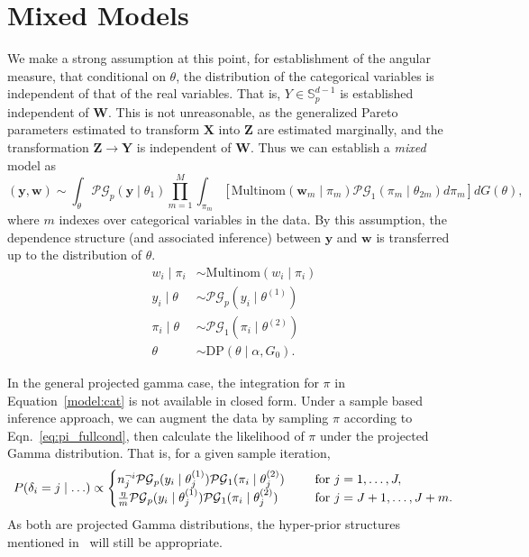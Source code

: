 \section{Mixed Models}
We make a strong assumption at this point, for establishment of the angular 
  measure, that conditional on $\theta$, the distribution of the categorical 
  variables is independent of that of the real variables.  That is, 
  $Y \in {\mathbb S}_{p}^{d-1}$ is established independent of $\bm{W}$.  This is 
  not unreasonable, as the generalized Pareto parameters estimated to transform 
  $\bm{X}$ into $\bm{Z}$ are estimated marginally, and the transformation 
  $\bm{Z}\to\bm{Y}$ is independent of $\bm{W}$.  Thus we can establish a 
  \emph{mixed} model as
  \begin{equation}
    \label{model:mixed}
    (\bm{y},\bm{w})\sim \int_{\theta}\mathcal{PG}_{p}(\bm{y}\mid\theta_1)
      \prod_{m = 1}^M\int_{\pi_m}
      \left[\text{Multinom}(\bm{w}_m\mid\pi_m)
                \mathcal{PG}_1(\pi_m\mid\theta_{2m})d\pi_{m}\right]dG(\theta),
  \end{equation}
  where $m$ indexes over categorical variables in the data. By this assumption, 
  the dependence structure (and associated inference) between $\bm{y}$ and 
  $\bm{w}$ is transferred up to the distribution of $\theta$.
  \begin{equation*}
    \label{model:mixeddp}
    \begin{aligned}
    w_i\mid \pi_i &\sim \text{Multinom}(w_i\mid \pi_i)\\
    y_i\mid\theta &\sim\mathcal{PG}_p(y_i\mid\theta^{(1)})\\
    \pi_i\mid\theta &\sim \mathcal{PG}_1(\pi_i\mid\theta^{(2)})\\
    \theta &\sim \text{DP}(\theta\mid\alpha, G_0).
    \end{aligned}
  \end{equation*}

In the general projected gamma case, the integration for $\pi$ in 
  Equation~\ref{model:cat} is not available in closed form.  Under a sample 
  based inference approach, we can augment the data by sampling $\pi$ according 
  to Eqn.~\ref{eq:pi_fullcond}, then calculate the likelihood of $\pi$ under the 
  projected Gamma distribution.  That is, for a given sample iteration,
  \begin{equation*}
    \begin{aligned}
    P(\delta_i = j\mid \ldots) \propto \begin{cases} 
    n_j^{\neg i}\mathcal{PG}_p(y_i\mid\theta_j^{(1)})
      \mathcal{PG}_1(\pi_i\mid\theta_j^{(2)}) \hspace{0.5cm}&\text{for }j = 1,\ldots,J,\\
    \frac{\eta}{m}\mathcal{PG}_p(y_i\mid\theta_j^{(1)})
      \mathcal{PG}_1(\pi_i\mid\theta_j^{(2)}) \hspace{0.5cm}&\text{for }j = J + 1,\ldots, J + m.\\
    \end{cases}
    \end{aligned}
  \end{equation*}
  As both are projected Gamma distributions, the hyper-prior structures mentioned 
  in~\cite{trubey:pg} will still be appropriate.


